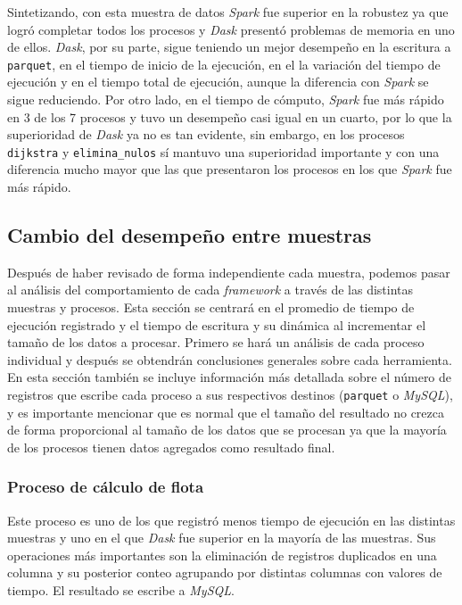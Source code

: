 Sintetizando, con esta muestra de datos \textit{Spark} fue superior en la robustez ya que logró completar todos los procesos y \textit{Dask} presentó problemas de memoria en uno de ellos. \textit{Dask}, por su parte, sigue teniendo un mejor desempeño en la escritura a \texttt{parquet}, en el tiempo de inicio de la ejecución, en el la variación del tiempo de ejecución y en el tiempo total de ejecución, aunque la diferencia con \textit{Spark} se sigue reduciendo. Por otro lado, en el tiempo de cómputo, \textit{Spark} fue más rápido en 3 de los 7 procesos y tuvo un desempeño casi igual en un cuarto, por lo que la superioridad de \textit{Dask} ya no es tan evidente, sin embargo, en los procesos \texttt{dijkstra} y \texttt{elimina\_nulos} sí mantuvo una superioridad importante y con una diferencia mucho mayor que las que presentaron los procesos en los que \textit{Spark} fue más rápido.


\subsection{Cambio del desempeño entre muestras}
\label{subsection:cambio-muestras-local}

Después de haber revisado de forma independiente cada muestra, podemos pasar al análisis del comportamiento de cada \textit{framework} a través de las distintas muestras y procesos. Esta sección se centrará en el promedio de tiempo de ejecución registrado y el tiempo de escritura y su dinámica al incrementar el tamaño de los datos a procesar. Primero se hará un análisis de cada proceso individual y después se obtendrán conclusiones generales sobre cada herramienta. En esta sección también se incluye información más detallada sobre el número de registros que escribe cada proceso a sus respectivos destinos (\texttt{parquet} o \textit{MySQL}), y es importante mencionar que es normal que el tamaño del resultado no crezca de forma proporcional al tamaño de los datos que se procesan ya que la mayoría de los procesos tienen datos agregados como resultado final.

\subsubsection{Proceso de cálculo de flota}

Este proceso es uno de los que registró menos tiempo de ejecución en las distintas muestras y uno en el que \textit{Dask} fue superior en la mayoría de las muestras. Sus operaciones más importantes son la eliminación de registros duplicados en una columna y su posterior conteo agrupando por distintas columnas con valores de tiempo. El resultado se escribe a \textit{MySQL}.

